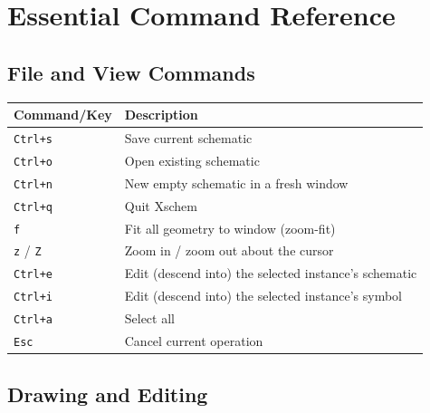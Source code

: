 \documentclass[11pt]{article}
\begin{document}
\section{Essential Command Reference}

\subsection{File and View Commands}

\begin{center}
\begin{tabular}{@{}lp{9.5cm}@{}}
\toprule
\textbf{Command/Key} & \textbf{Description} \\
\midrule
\texttt{Ctrl+s}                & Save current schematic \\
\texttt{Ctrl+o}                & Open existing schematic \\
\texttt{Ctrl+n}                & New empty schematic in a fresh window \\
\texttt{Ctrl+q}                & Quit Xschem \\
\texttt{f}                     & Fit all geometry to window (zoom-fit) \\
\texttt{z} / \texttt{Z}        & Zoom in / zoom out about the cursor \\
\texttt{Ctrl+e}                & Edit (descend into) the selected
                                 instance's schematic \\
\texttt{Ctrl+i}                & Edit (descend into) the selected
                                 instance's symbol \\
\texttt{Ctrl+a}                & Select all \\
\texttt{Esc}                   & Cancel current operation \\
\bottomrule
\end{tabular}
\end{center}

\subsection{Drawing and Editing}
\end{document}
